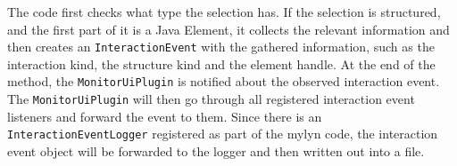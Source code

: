 The code first checks what type the selection has. If the selection is structured, and the first part of it is a Java Element, it collects the relevant information and then creates an \texttt{InteractionEvent} with the gathered information, such as the interaction kind, the structure kind and the element handle. At the end of the method, the \texttt{MonitorUiPlugin} is notified about the observed interaction event. The \texttt{MonitorUiPlugin} will then go through all registered interaction event listeners and forward the event to them. Since there is an \texttt{InteractionEventLogger} registered as part of the mylyn code, the interaction event object will be forwarded to the logger and then written out into a file. 

